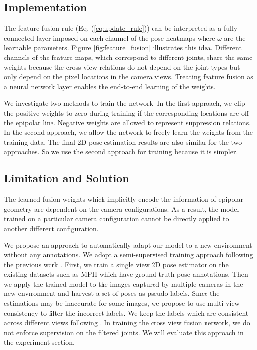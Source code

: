 \documentclass[10pt,twocolumn,letterpaper]{article}
\begin{document}
\subsection{Implementation}
The feature fusion rule (Eq. (\ref{eq:update_rule})) can be interpreted as a fully connected layer imposed on each channel of the pose heatmaps where $\omega$ are the learnable parameters. Figure \ref{fig:feature_fusion} illustrates this idea. 
Different channels of the feature maps, which correspond to different joints, share the same weights because the cross view relations do not depend on the joint types but only depend on the pixel locations in the camera views. Treating feature fusion as a neural network layer enables the end-to-end learning of the weights. 

We investigate two methods to train the network. In the first approach, we clip the positive weights to zero during training if the corresponding locations are off the epipolar line. Negative weights are allowed to represent suppression relations. In the second approach, we allow the network to freely learn the weights from the training data. The final 2D pose estimation results are also similar for the two approaches. So we use the second approach for training because it is simpler.


\subsection{Limitation and Solution}
The learned fusion weights which implicitly encode the information of epipolar geometry are dependent on the camera configurations. As a result, the model trained on a particular camera configuration cannot be directly applied to another different configuration. 

We propose an approach to automatically adapt our model to a new environment without any annotations. 
We adopt a semi-supervised training approach following the previous work \cite{simon2017hand}. First, we train a single view 2D pose estimator \cite{simplebaselines} on the existing datasets such as MPII which have ground truth pose annotations. Then we apply the trained model to the images captured by multiple cameras in the new environment and harvest a set of poses as pseudo labels. Since the estimations may be inaccurate for some images, we propose to use multi-view consistency to filter the incorrect labels. We keep the labels which are consistent across different views following \cite{simon2017hand}. In training the cross view fusion network, we do not enforce supervision on the filtered joints. We will evaluate this approach in the experiment section.
\end{document}
